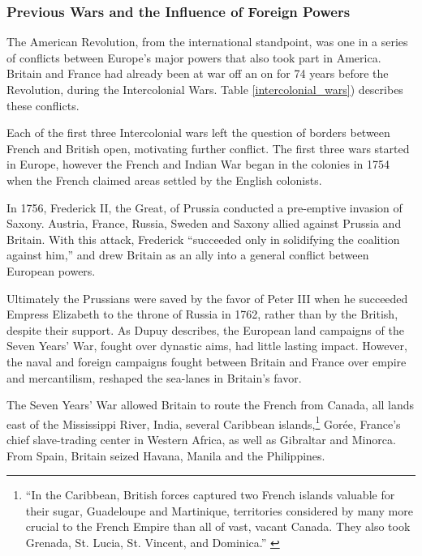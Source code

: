 \subsubsection{Previous Wars and the Influence of Foreign Powers}

The American Revolution, from the international standpoint, was one in a series
of conflicts between Europe's major powers that also took part in America.
Britain and France had already been at war off an on for 74 years before
the Revolution, during the Intercolonial Wars. Table \ref{intercolonial_wars})
describes these conflicts.


Each of the first three Intercolonial wars left the question of borders between
French and British open, motivating further conflict. The first three wars
started in Europe, however the French and Indian War began in the colonies in
1754 when the French claimed areas settled by the English colonists.

In 1756, Frederick II, the Great, of Prussia conducted a pre-emptive invasion of
Saxony. Austria, France, Russia, Sweden and Saxony allied against Prussia and
Britain. With this attack, Frederick ``succeeded only in solidifying the
coalition against him,''\cite{dupuy_1977} and drew Britain as an ally into a
general conflict between European powers. 

Ultimately the Prussians were saved by the favor of Peter III when he succeeded
Empress Elizabeth to the throne of Russia in 1762, rather than by the British,
despite their support. As Dupuy describes, the European land campaigns of
the Seven Years' War, fought over dynastic aims, had little lasting impact.
However, the naval and foreign campaigns fought between Britain and France over
empire and mercantilism, reshaped the sea-lanes in Britain's favor.

The Seven Years' War allowed Britain to route the French from
Canada, all lands east of the Mississippi River, India, several Caribbean
islands,\footnote{``In the Caribbean, British forces captured two French islands
valuable for their sugar, Guadeloupe and Martinique, territories considered by
many more crucial to the French Empire than all of vast, vacant Canada. They
also took Grenada, St. Lucia, St. Vincent, and Dominica.'' \cite[8]{dupuy_1977}}
Gor\'ee, France's chief slave-trading center in Western Africa, as well as
Gibraltar and Minorca.\cite[7-9]{dupuy_1977} From Spain, Britain seized Havana,
Manila and the Philippines.

